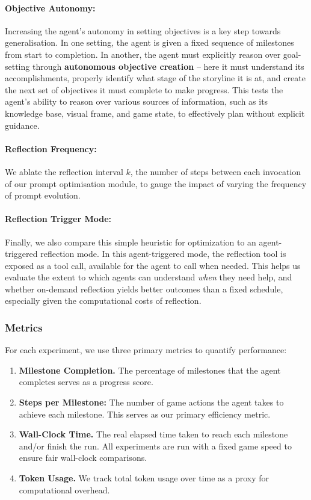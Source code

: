\documentclass[11pt]{article}
\newcommand{\ignore}[1]{{}}
\begin{document}
\paragraph{Objective Autonomy:} Increasing the agent’s autonomy in setting objectives is a key step towards generalisation. In one setting, the agent is given a fixed sequence of milestones from start to completion. In another, the agent must explicitly reason over goal-setting through \textbf{autonomous objective creation} – here it must understand its accomplishments, properly identify what stage of the storyline it is at, and create the next set of objectives it must complete to make progress. This tests the agent’s ability to reason over various sources of information, such as its knowledge base, visual frame, and game state, to effectively plan without explicit guidance. 

\paragraph{Reflection Frequency:} We ablate the reflection interval $k$, the number of steps between each invocation of our prompt optimisation module, to gauge the impact of varying the frequency of prompt evolution. 

\paragraph{Reflection Trigger Mode:} Finally, we also compare this simple heuristic for optimization to an agent-triggered reflection mode. In this agent-triggered mode, the reflection tool is exposed as a tool call, available for the agent to call when needed. This helps us evaluate the extent to which agents can understand \textit{when} they need help, and whether on-demand reflection yields better outcomes than a fixed schedule, especially given the computational costs of reflection.

\subsubsection{Metrics} For each experiment, we use three primary metrics to quantify performance:

\begin{enumerate}
    \item \textbf{Milestone Completion.} The percentage of milestones that the agent completes serves as a progress score.
    \item \textbf{Steps per Milestone:} The number of game actions the agent takes to achieve each milestone. This serves as our primary efficiency metric.
    \item \textbf{Wall-Clock Time.} The real elapsed time taken to reach each milestone and/or finish the run. \ignore{Using a larger model or doing frequent reflections may slow down decision-making, resulting in more real-time per milestone even if the in-game steps are optimised.} All experiments are run with a fixed game speed to ensure fair wall-clock comparisons.
    \item \textbf{Token Usage.} We track total token usage over time as a proxy for computational overhead.
\end{enumerate}
\end{document}
